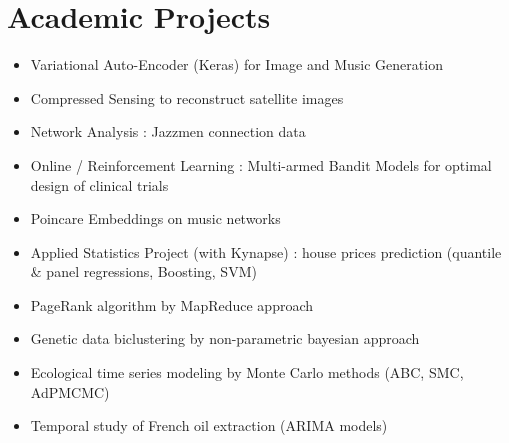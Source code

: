 \documentclass[10pt,a4paper,sans]{moderncv}
\begin{document}


\section{Academic Projects}


\begin{minipage}{0.49\textwidth}
\begin{itemize}
    \item Variational Auto-Encoder (Keras) for Image and Music Generation
    \item Compressed Sensing to reconstruct satellite images
    \item Network Analysis : Jazzmen connection data 
    \item Online / Reinforcement Learning : Multi-armed Bandit Models for optimal design of clinical trials
    \item Poincare Embeddings on music networks
\end{itemize}
\end{minipage}
\hfill
\begin{minipage}{0.49\textwidth}
\begin{itemize}
     \item Applied Statistics Project (with Kynapse) : house prices prediction (quantile \& panel regressions, Boosting, SVM)
    \item PageRank algorithm by MapReduce approach
    \item Genetic data biclustering by non-parametric bayesian approach 
    \item Ecological time series modeling by Monte Carlo methods (ABC, SMC, AdPMCMC)
    \item Temporal study of French oil extraction (ARIMA models)
\end{itemize}
\end{minipage}
\end{document}
